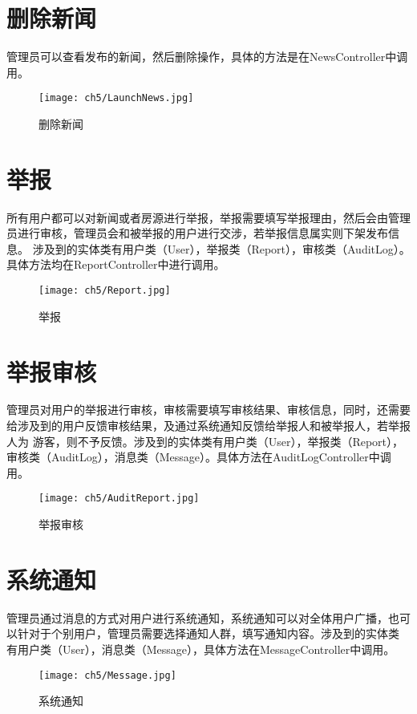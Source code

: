 \section{删除新闻}
管理员可以查看发布的新闻，然后删除操作，具体的方法是在NewsController中调用。
\begin{figure}[htbp]
    \centering
    \texttt{[image: ch5/LaunchNews.jpg]}
    \caption{删除新闻}\label{fig:DeleteNews}
    \vspace{\baselineskip} %
\end{figure}
\section{举报}
所有用户都可以对新闻或者房源进行举报，举报需要填写举报理由，然后会由管理员进行审核，管理员会和被举报的用户进行交涉，若举报信息属实则下架发布信息。
涉及到的实体类有用户类（User），举报类（Report），审核类（AuditLog）。具体方法均在ReportController中进行调用。
\begin{figure}[htbp]
    \centering
    \texttt{[image: ch5/Report.jpg]}
    \caption{举报}\label{fig:Report}
    \vspace{\baselineskip} %
\end{figure}
\section{举报审核}
管理员对用户的举报进行审核，审核需要填写审核结果、审核信息，同时，还需要给涉及到的用户反馈审核结果，及通过系统通知反馈给举报人和被举报人，若举报人为
游客，则不予反馈。涉及到的实体类有用户类（User），举报类（Report），审核类（AuditLog），消息类（Message）。具体方法在AuditLogController中调用。
\begin{figure}[htbp]
    \centering
    \texttt{[image: ch5/AuditReport.jpg]}
    \caption{举报审核}\label{fig:AuditReport}
    \vspace{\baselineskip} %
\end{figure}
\section{系统通知}
管理员通过消息的方式对用户进行系统通知，系统通知可以对全体用户广播，也可以针对于个别用户，管理员需要选择通知人群，填写通知内容。涉及到的实体类
有用户类（User），消息类（Message），具体方法在MessageController中调用。
\begin{figure}[htbp]
    \centering
    \texttt{[image: ch5/Message.jpg]}
    \caption{系统通知}\label{fig:Message}
    \vspace{\baselineskip} %
\end{figure}
